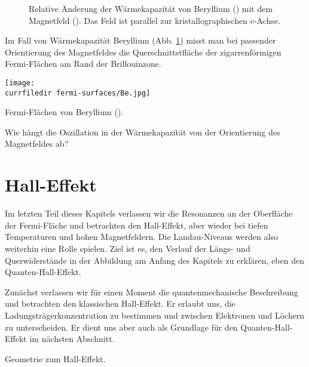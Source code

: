 \begin{figure}
   \caption{Relative Änderung der Wärmekapazität von Beryllium () mit dem Magnetfeld (\cite{Sullivan68_beryllium}). Das Feld ist parallel zur kristallographischen c-Achse. \label{fig:4_beryllium}}
\end{figure}

Im Fall von Wärmekapazität Beryllium (Abb. \ref{fig:4_beryllium}) misst man bei passender Orientierung des Magnetfeldes die Querschnittstfläche der zigarrenförmigen Fermi-Flächen am Rand der Brillouinzone. 

\begin{marginfigure}
   \texttt{[image: \\currfiledir fermi-surfaces/Be.jpg]}
   \caption{Fermi-Flächen von  Beryllium (\cite{Choy00_fermi_surfaces}).}
\end{marginfigure}

\begin{questions}
   \item Wie hängt die  Oszillation in der Wärmekapazität von der Orientierung des Magnetfeldes ab? 
\end{questions}


\section{Hall-Effekt}

Im letzten Teil dieses Kapitels verlassen wir die Resonanzen an der Oberfläche der Fermi-Fläche und betrachten den Hall-Effekt, aber wieder bei tiefen Temperaturen und hohen Magnetfeldern. Die Landau-Niveaus werden also weiterhin eine Rolle spielen. Ziel ist es, den Verlauf der Längs- und Querwiderstände in der Abbildung am Anfang des Kapitels zu erklären, eben den Quanten-Hall-Effekt.

Zunächst verlassen wir für einen Moment die quantenmechanische Beschreibung und betrachten den klassischen Hall-Effekt. Er erlaubt uns, die Ladungsträgerkonzentration zu bestimmen und zwischen Elektronen und Löchern zu unterscheiden. Er dient uns aber auch als Grundlage für den Quanten-Hall-Effekt im nächsten Abschnitt.

\begin{marginfigure}
   \caption{Geometrie zum Hall-Effekt.}
\end{marginfigure}

